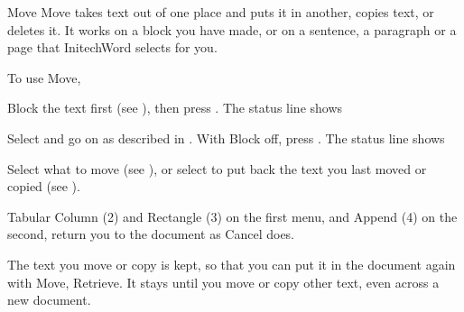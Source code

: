 \begin{Feature}{Move}
Move takes text out of one place and puts it in another, copies text, or
deletes it.  It works on a block you have made, or on a sentence, a
paragraph or a page that InitechWord selects for you.

To use Move,
\begin{WPSteps}
\item Block the text first (see ), then press
.  The status line shows
\par Select  and go on as described in .
\Or
With Block off, press .  The status line shows
\par Select what to move (see ), or
select  to put back the text you last moved or copied (see
).
\end{WPSteps}

\Notes
{}
Tabular Column (2) and Rectangle (3) on the first menu, and Append (4) on
the second, return you to the document as Cancel does.

The text you move or copy is kept, so that you can put it in the document
again with Move, Retrieve.  It stays until you move or copy other text, even
across a new document.

\end{Feature}


